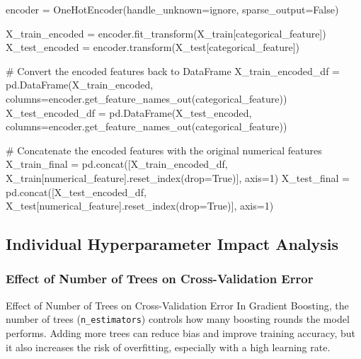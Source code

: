 \documentclass[
  letterpaper,
  DIV=11,
  numbers=noendperiod]{scrreprt}
\newenvironment{Shaded}{\begin{snugshade}}{\end{snugshade}}
\newcommand{\CommentTok}[1]{\textcolor[rgb]{0.37,0.37,0.37}{#1}}
\newcommand{\DecValTok}[1]{\textcolor[rgb]{0.68,0.00,0.00}{#1}}
\newcommand{\NormalTok}[1]{\textcolor[rgb]{0.00,0.23,0.31}{#1}}
\newcommand{\OperatorTok}[1]{\textcolor[rgb]{0.37,0.37,0.37}{#1}}
\newcommand{\StringTok}[1]{\textcolor[rgb]{0.13,0.47,0.30}{#1}}
\newcommand{\VariableTok}[1]{\textcolor[rgb]{0.07,0.07,0.07}{#1}}
\begin{document}
\begin{Shaded}
\begin{Highlighting}[]
\NormalTok{encoder }\OperatorTok{=}\NormalTok{ OneHotEncoder(handle\_unknown}\OperatorTok{=}\StringTok{\textquotesingle{}ignore\textquotesingle{}}\NormalTok{, sparse\_output}\OperatorTok{=}\VariableTok{False}\NormalTok{)}

\NormalTok{X\_train\_encoded }\OperatorTok{=}\NormalTok{ encoder.fit\_transform(X\_train[categorical\_feature])}
\NormalTok{X\_test\_encoded }\OperatorTok{=}\NormalTok{ encoder.transform(X\_test[categorical\_feature])}

\CommentTok{\# Convert the encoded features back to DataFrame}
\NormalTok{X\_train\_encoded\_df }\OperatorTok{=}\NormalTok{ pd.DataFrame(X\_train\_encoded, columns}\OperatorTok{=}\NormalTok{encoder.get\_feature\_names\_out(categorical\_feature))}
\NormalTok{X\_test\_encoded\_df }\OperatorTok{=}\NormalTok{ pd.DataFrame(X\_test\_encoded, columns}\OperatorTok{=}\NormalTok{encoder.get\_feature\_names\_out(categorical\_feature))}

\CommentTok{\# Concatenate the encoded features with the original numerical features}
\NormalTok{X\_train\_final }\OperatorTok{=}\NormalTok{ pd.concat([X\_train\_encoded\_df, X\_train[numerical\_feature].reset\_index(drop}\OperatorTok{=}\VariableTok{True}\NormalTok{)], axis}\OperatorTok{=}\DecValTok{1}\NormalTok{)}
\NormalTok{X\_test\_final }\OperatorTok{=}\NormalTok{ pd.concat([X\_test\_encoded\_df, X\_test[numerical\_feature].reset\_index(drop}\OperatorTok{=}\VariableTok{True}\NormalTok{)], axis}\OperatorTok{=}\DecValTok{1}\NormalTok{)}
\end{Highlighting}
\end{Shaded}

\subsection{Individual Hyperparameter Impact
Analysis}\label{individual-hyperparameter-impact-analysis}

\subsubsection{Effect of Number of Trees on Cross-Validation
Error}\label{effect-of-number-of-trees-on-cross-validation-error}

Effect of Number of Trees on Cross-Validation Error In Gradient
Boosting, the number of trees (\texttt{n\_estimators}) controls how many
boosting rounds the model performs. Adding more trees can reduce bias
and improve training accuracy, but it also increases the risk of
overfitting, especially with a high learning rate.
\end{document}
